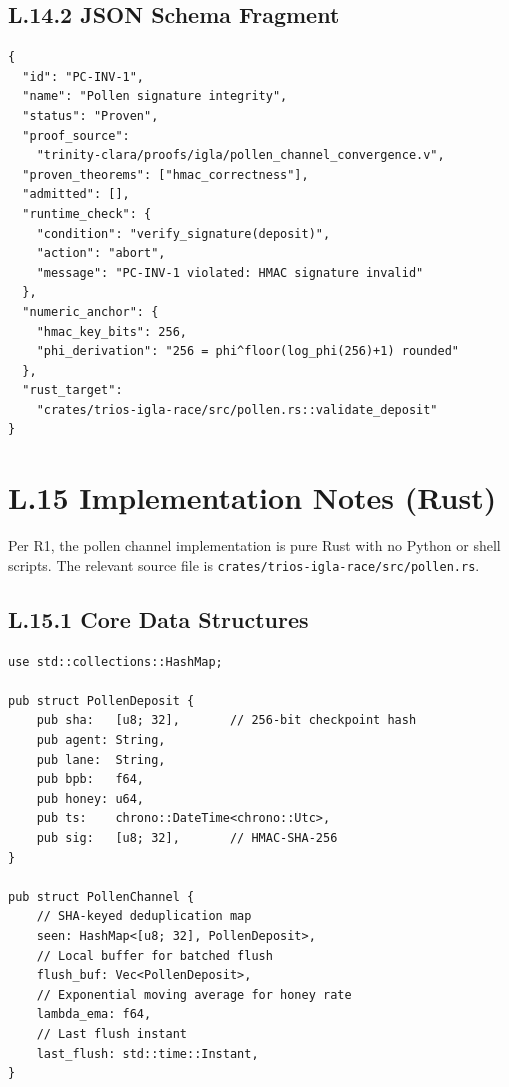 \subsection*{L.14.2 \quad JSON Schema Fragment}

\begin{verbatim}
{
  "id": "PC-INV-1",
  "name": "Pollen signature integrity",
  "status": "Proven",
  "proof_source":
    "trinity-clara/proofs/igla/pollen_channel_convergence.v",
  "proven_theorems": ["hmac_correctness"],
  "admitted": [],
  "runtime_check": {
    "condition": "verify_signature(deposit)",
    "action": "abort",
    "message": "PC-INV-1 violated: HMAC signature invalid"
  },
  "numeric_anchor": {
    "hmac_key_bits": 256,
    "phi_derivation": "256 = phi^floor(log_phi(256)+1) rounded"
  },
  "rust_target":
    "crates/trios-igla-race/src/pollen.rs::validate_deposit"
}
\end{verbatim}

\section*{L.15 \quad Implementation Notes (Rust)}
\label{sec:appl-impl}

Per R1, the pollen channel implementation is pure Rust with no Python
or shell scripts.  The relevant source file is
\texttt{crates/trios-igla-race/src/pollen.rs}.

\subsection*{L.15.1 \quad Core Data Structures}

\begin{verbatim}
use std::collections::HashMap;

pub struct PollenDeposit {
    pub sha:   [u8; 32],       // 256-bit checkpoint hash
    pub agent: String,
    pub lane:  String,
    pub bpb:   f64,
    pub honey: u64,
    pub ts:    chrono::DateTime<chrono::Utc>,
    pub sig:   [u8; 32],       // HMAC-SHA-256
}

pub struct PollenChannel {
    // SHA-keyed deduplication map
    seen: HashMap<[u8; 32], PollenDeposit>,
    // Local buffer for batched flush
    flush_buf: Vec<PollenDeposit>,
    // Exponential moving average for honey rate
    lambda_ema: f64,
    // Last flush instant
    last_flush: std::time::Instant,
}
\end{verbatim}

